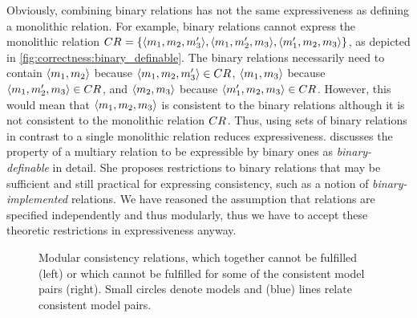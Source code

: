 Obviously, combining binary relations has not the same expressiveness as defining a monolithic relation.
For example, binary relations cannot express the monolithic relation $\consistencyrelation{CR}{} = \setted{\tupled{\model{m}{1}, \model{m}{2}, \model{m}{3}'}, \tupled{\model{m}{1}, \model{m}{2}', \model{m}{3}}, \tupled{\model{m}{1}', \model{m}{2}, \model{m}{3}}}$, as depicted in \autoref{fig:correctness:binary_definable}.
The binary relations necessarily need to contain $\tupled{\model{m}{1}, \model{m}{2}}$ because $\tupled{\model{m}{1}, \model{m}{2}, \model{m}{3}'} \in \consistencyrelation{CR}{}$, $\tupled{\model{m}{1}, \model{m}{3}}$ because $\tupled{\model{m}{1}, \model{m}{2}', \model{m}{3}} \in \consistencyrelation{CR}{}$, and $\tupled{\model{m}{2}, \model{m}{3}}$ because $\tupled{\model{m}{1}', \model{m}{2}, \model{m}{3}} \in \consistencyrelation{CR}{}$. 
However, this would mean that $\tupled{\model{m}{1}, \model{m}{2}, \model{m}{3}}$ is consistent to the binary relations although it is not consistent to the monolithic relation $\consistencyrelation{CR}{}$.
Thus, using sets of binary relations in contrast to a single monolithic relation reduces expressiveness.
\textcite{stevens2020BidirectionalTransformationLarge-SoSym} discusses the property of a multiary relation to be expressible by binary ones as \emph{binary-definable} in detail.
She proposes restrictions to binary relations that may be sufficient and still practical for expressing consistency, such as a notion of \emph{binary-implemented} relations.
We have reasoned the assumption that relations are specified independently and thus modularly, thus we have to accept these theoretic restrictions in expressiveness anyway.

\begin{figure}
    \centering
    
    \caption[Example for incompatible consistency relations]{Modular consistency relations, which together cannot be fulfilled (left) or which cannot be fulfilled for some of the consistent model pairs (right). Small circles denote models and (blue) lines relate consistent model pairs.}
    \label{fig:correctness:contradictions_example}
\end{figure}

